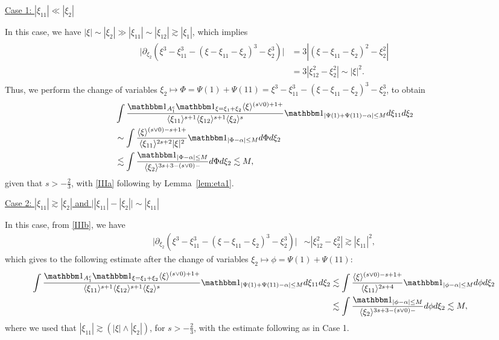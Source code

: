 \documentclass[%
11pt,  reqno]{amsart}
\newcommand{\5}{\textup{V}}
\newcommand{\noi}{\noindent}
\newcommand{\ind}{\mathbbm 1}
\newcommand{\les}{\lesssim}
\theoremstyle{remark}
\newcommand{\al}{\alpha}
\newcommand{\ges}{\gtrsim}
\newcommand{\jb}[1]
{\langle #1 \rangle}
\numberwithin{equation}{section}
\numberwithin{theorem}{section}
\begin{document}
\noi
\underline{Case 1: $|\xi_{11}| \ll |\xi_2|$}

In this case, we have $|\xi| \sim |\xi_2| \gg  |\xi_{11}| \sim |\xi_{12}| \ges |\xi_1|$, which implies
\begin{align}\label{IIIb}
\begin{split}
\big| 
\partial_{\xi_{2}}  (\xi^3 - \xi_{11}^3 - (\xi-\xi_{11}-\xi_2)^3 - \xi_2^3)
\big|
&
= 3 | (\xi-\xi_{11}-\xi_2)^2 - \xi_2^2|
\\
&
=3|\xi_{12}^2 - \xi_2^2|
\sim |\xi|^2. 
\end{split}
\end{align}
Thus, we perform the change of variables $\xi_2 \mapsto \Phi = \Psi(1) + \Psi(11) = \xi^3 - \xi^3_{11} - (\xi-\xi_{11}-\xi_2)^3 - \xi_2^3$, to obtain
\begin{align}
&
\int \frac{ \ind_{A_1^c} \ind_{\xi=\xi_1+\xi_2} \jb{\xi}^{(s\lor 0)+1 + }  }{ \jb{\xi_{11}}^{s+1  } \jb{\xi_{12}}^{s+1} \jb{\xi_{2}}^s }
\ind_{|\Psi(1) + \Psi(11) - \al| \le M}
d\xi_{11} d\xi_2
\\
&
\sim \int \frac{ \jb{\xi}^{(s\lor0)  - s +  1 + } }{ \jb{\xi_{11}}^{2s+2} |\xi|^2  } \ind_{|\Phi - \al|\le M } d\Phi d\xi_2 
\\
&
\les \int \frac{\ind_{|\Phi - \al|\le M }}{ \jb{\xi_2}^{3s+3- (s \lor 0) - } } d\Phi d\xi_2 \les M, 
\end{align}
given that $s>-\frac23$, with \eqref{IIIa} following by Lemma~\ref{lem:eta1}. 



\noi
\underline{Case 2: $|\xi_{11}| \ges |\xi_2|$ and $\big| |\xi_{11}| - |\xi_2| \big| \sim |\xi_{11}|$}

In this case, from \eqref{IIIb}, we have
\begin{align}
\big| 
\partial_{\xi_{2}}  (\xi^3 - \xi_{11}^3 - (\xi-\xi_{11}-\xi_2)^3 - \xi_2^3)
\big|
&
\sim |\xi_{12}^2 - \xi_2^2| \ges |\xi_{11}|^2,
\end{align}
which gives to the following estimate after the change of variables $\xi_{2} \mapsto \phi = \Psi(1) + \Psi(11)$:
\begin{align}
\int \frac{\ind_{A_1^c} \ind_{\xi=\xi_1+\xi_2} \jb{\xi}^{(s \lor 0 )+ 1+}}{ \jb{\xi_{11}}^{s+1} \jb{\xi_{12}}^{s+1} \jb{\xi_2}^s}
\ind_{|\Psi(1) + \Psi(11) - \al| \le M}
d\xi_{11} d\xi_2
&
\les \int \frac{\jb{\xi}^{(s\lor0) - s + 1 +} }{ \jb{\xi_{11}}^{2s+4}  } \ind_{|\phi - \al | \le M } d\phi d\xi_2
\\
&
\les \int \frac{\ind_{|\phi - \al|\le M }}{ \jb{\xi_2}^{3s + 3 -(s \lor 0)-} } d\phi d\xi_2 \les M, 
\end{align}
where we used that $|\xi_{11}| \ges (|\xi| \land |\xi_2|)$, for $s>-\frac23$, with the estimate following as in Case 1. 
\end{document}
